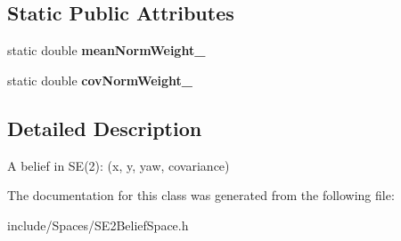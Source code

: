\subsection*{\-Static \-Public \-Attributes}
\begin{DoxyCompactItemize}
\item 
\hypertarget{class_s_e2_belief_space_1_1_state_type_a4f0f638f62e339fd8cdcb43b3c49f2a6}{static double {\bfseries mean\-Norm\-Weight\-\_\-}}\label{class_s_e2_belief_space_1_1_state_type_a4f0f638f62e339fd8cdcb43b3c49f2a6}

\item 
\hypertarget{class_s_e2_belief_space_1_1_state_type_accb04f4d8d86cd9ba3626f2a96611fff}{static double {\bfseries cov\-Norm\-Weight\-\_\-}}\label{class_s_e2_belief_space_1_1_state_type_accb04f4d8d86cd9ba3626f2a96611fff}

\end{DoxyCompactItemize}


\subsection{\-Detailed \-Description}
\-A belief in \-S\-E(2)\-: (x, y, yaw, covariance) 

\-The documentation for this class was generated from the following file\-:\begin{DoxyCompactItemize}
\item 
include/\-Spaces/\-S\-E2\-Belief\-Space.\-h\end{DoxyCompactItemize}
